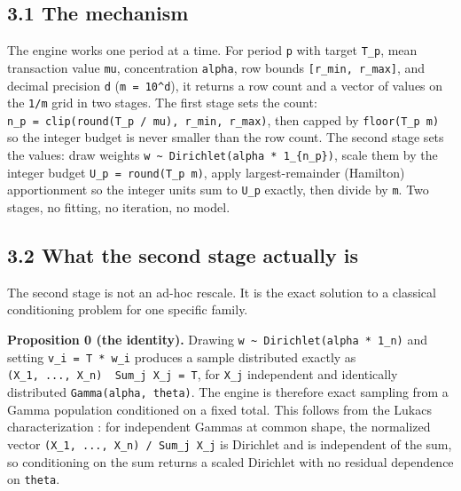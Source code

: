 \hypertarget{the-mechanism}{%
\subsection{3.1 The mechanism}\label{the-mechanism}}

The engine works one period at a time. For period \texttt{p} with target
\texttt{T\_\allowbreak{}p}, mean transaction value \texttt{mu}, concentration
\texttt{alpha}, row bounds \texttt{{[}r\_\allowbreak{}min,\ r\_\allowbreak{}max{]}}, and decimal
precision \texttt{d} (\texttt{m\ =\ 10\^{}d}), it returns a row count
and a vector of values on the \texttt{1/\allowbreak{}m} grid in two stages. The first
stage sets the count:
\texttt{n\_\allowbreak{}p\ =\ clip(round(T\_\allowbreak{}p\ /\allowbreak{}\ mu),\ r\_\allowbreak{}min,\ r\_\allowbreak{}max)}, then
capped by \texttt{floor(T\_\allowbreak{}p\ m)} so the integer budget is never smaller
than the row count. The second stage sets the values: draw weights
\texttt{w\ \textasciitilde{}\ Dirichlet(alpha\ *\ 1\_\allowbreak{}\{n\_\allowbreak{}p\})}, scale
them by the integer budget \texttt{U\_\allowbreak{}p\ =\ round(T\_\allowbreak{}p\ m)}, apply
largest-remainder (Hamilton) apportionment \cite{balinski1982fair} so
the integer units sum to \texttt{U\_\allowbreak{}p} exactly, then divide by
\texttt{m}. Two stages, no fitting, no iteration, no model.

\hypertarget{what-the-second-stage-actually-is}{%
\subsection{3.2 What the second stage actually
is}\label{what-the-second-stage-actually-is}}

The second stage is not an ad-hoc rescale. It is the exact solution to a
classical conditioning problem for one specific family.

\textbf{Proposition 0 (the identity).} Drawing
\texttt{w\ \textasciitilde{}\ Dirichlet(alpha\ *\ 1\_\allowbreak{}n)} and setting
\texttt{v\_\allowbreak{}i\ =\ T\ *\ w\_\allowbreak{}i} produces a sample distributed exactly as
\texttt{(X\_\allowbreak{}1,\ ...,\ X\_\allowbreak{}n)\ \textbar{}\ Sum\_\allowbreak{}j\ X\_\allowbreak{}j\ =\ T}, for
\texttt{X\_\allowbreak{}j} independent and identically distributed
\texttt{Gamma(alpha,\ theta)}. The engine is therefore exact sampling
from a Gamma population conditioned on a fixed total. This follows from
the Lukacs characterization \cite{lukacs1955gamma}: for independent
Gammas at common shape, the normalized vector
\texttt{(X\_\allowbreak{}1,\ ...,\ X\_\allowbreak{}n)\ /\allowbreak{}\ Sum\_\allowbreak{}j\ X\_\allowbreak{}j} is Dirichlet and is
independent of the sum, so conditioning on the sum returns a scaled
Dirichlet with no residual dependence on \texttt{theta}.

